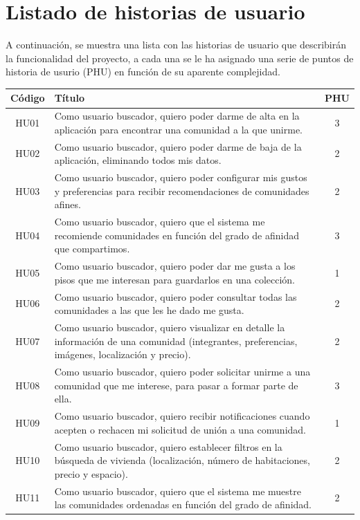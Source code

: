 \section{Listado de historias de usuario}
A continuación, se muestra una lista con las historias de usuario que describirán la funcionalidad del proyecto, a cada una se le ha asignado una serie de puntos de historia de usurio (PHU) en función de su aparente complejidad.
\newpage

\renewcommand{\arraystretch}{1.3}
\begin{longtable}{|c|p{12cm}|c|}
    \hline
    \textbf{Código} & \textbf{Título} & \textbf{PHU} \\
    \hline \hline
    HU01 & Como usuario buscador, quiero poder darme de alta en la aplicación para encontrar una comunidad a la que unirme. & 3 \\
    \hline
    HU02 & Como usuario buscador, quiero poder darme de baja de la aplicación, eliminando todos mis datos. & 2 \\
    \hline
    HU03 & Como usuario buscador, quiero poder configurar mis gustos y preferencias para recibir recomendaciones de comunidades afines. & 2 \\
    \hline
    HU04 & Como usuario buscador, quiero que el sistema me recomiende comunidades en función del grado de afinidad que compartimos. & 3 \\
    \hline
    HU05 & Como usuario buscador, quiero poder dar me gusta a los pisos que me interesan para guardarlos en una colección. & 1 \\
    \hline
    HU06 & Como usuario buscador, quiero poder consultar todas las comunidades a las que les he dado me gusta. & 2 \\
    \hline
    HU07 & Como usuario buscador, quiero visualizar en detalle la información de una comunidad (integrantes, preferencias, imágenes, localización y precio). & 2 \\
    \hline
    HU08 & Como usuario buscador, quiero poder solicitar unirme a una comunidad que me interese, para pasar a formar parte de ella. & 3 \\
    \hline
    HU09 & Como usuario buscador, quiero recibir notificaciones cuando acepten o rechacen mi solicitud de unión a una comunidad. & 1 \\
    \hline
    HU10 & Como usuario buscador, quiero establecer filtros en la búsqueda de vivienda (localización, número de habitaciones, precio y espacio). & 2 \\
    \hline
    HU11 & Como usuario buscador, quiero que el sistema me muestre las comunidades ordenadas en función del grado de afinidad. & 2 \\

\end{longtable}
